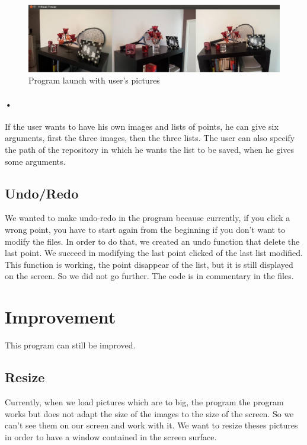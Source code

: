 \documentclass{report}
\begin{document}
\begin{center}
\begin{figure}
    \includegraphics[scale=0.334]{images.png}
    \caption{Program launch with user's pictures}
    \label{Picture 2}
\end{figure} 
\end{center}

\paragraph{•}
If the user wants to have his own images and lists of points, he can give six arguments, first the three images, then the three lists. 
The user can also specify the path of the repository in which he wants the list to be saved, when he gives some arguments. 

\subsection{Undo/Redo}
We wanted to make undo-redo in the program because currently, if you click a wrong point, you have to start again from the beginning if you don't want to modify the files. In order to do that, we created an undo function that delete the last point. We succeed in modifying the last point clicked of the last list modified. This function is working, the point disappear of the list, but it is still displayed on the screen. 
So we did not go further. The code is in commentary in the files. 

\section{Improvement}
This program can still be improved. 

\subsection{Resize }
Currently, when we load pictures which are to big, the program the program works but does not adapt the size of the images to the size of the screen. So we can't see them on our screen and work with it. 
We want to resize theses pictures in order to have a window contained in the screen surface. 
\end{document}

